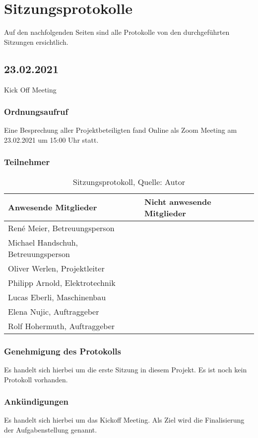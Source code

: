 \section{Sitzungsprotokolle}
Auf den nachfolgenden Seiten sind alle Protokolle von den durchgeführten Sitzungen ersichtlich.
\subsection{23.02.2021}\label{kickOff}
Kick Off Meeting
\subsubsection{Ordnungsaufruf}
Eine Besprechung aller Projektbeteiligten fand Online als Zoom Meeting am 23.02.2021 um 15:00 Uhr statt.
\subsubsection{Teilnehmer}
\begin{table}[H]
	\setlength\extrarowheight{2pt} %
	\begin{tabularx}{\textwidth}{|X|X|}
		\hline
		\textbf{Anwesende Mitglieder} &  \textbf{Nicht anwesende Mitglieder} \\
		\hline
		René Meier, Betreuungsperson & \\
		Michael Handschuh, Betreuungsperson &\\
		Oliver Werlen, Projektleiter &  \\
		Philipp Arnold, Elektrotechnik & \\
		Lucas Eberli, Maschinenbau & \\
		Elena Nujic, Auftraggeber & \\
		Rolf Hohermuth, Auftraggeber &\\
		\hline
	\end{tabularx}
	\caption{ \label{tbl: Teilnehmerliste vom 23.02.2021}Sitzungsprotokoll, Quelle: Autor}
\end{table}
\subsubsection{Genehmigung des Protokolls}
Es handelt sich hierbei um die erste Sitzung in diesem Projekt. Es ist noch kein Protokoll vorhanden. 
\subsubsection{Ankündigungen}
Es handelt sich hierbei um das Kickoff Meeting. Als Ziel wird die Finalisierung der Aufgabenstellung genannt. 
